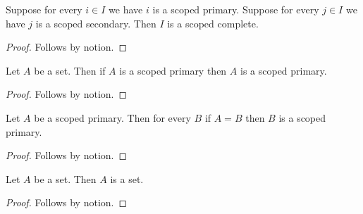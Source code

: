 \begin{proposition}\label{horn_scoped_whole_premise_consumer}
    Suppose for every $i\in I$ we have $i$ is a scoped primary.
    Suppose for every $j\in I$ we have $j$ is a scoped secondary.
    Then $I$ is a scoped complete.
\end{proposition}
\begin{proof}
    Follows by notion.
\end{proof}

\begin{proposition}\label{horn_scoped_implication}
    Let $A$ be a set.
    Then if $A$ is a scoped primary then $A$ is a scoped primary.
\end{proposition}
\begin{proof}
    Follows by notion.
\end{proof}


\begin{proposition}\label{horn_scoped_equality_assumption}
    Let $A$ be a scoped primary.
    Then for every $B$ if $A=B$ then $B$ is a scoped primary.
\end{proposition}
\begin{proof}
    Follows by notion.
\end{proof}

\begin{proposition}\label{horn_scoped_truth}
    Let $A$ be a set.
    Then $A$ is a set.
\end{proposition}
\begin{proof}
    Follows by notion.
\end{proof}
